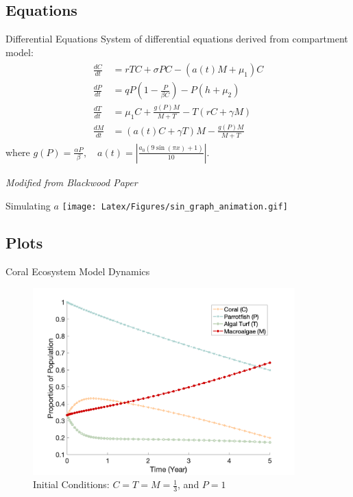 \documentclass{beamer}
\begin{document}
\subsection{Equations}
\begin{frame}{Differential Equations}
    System of differential equations derived from compartment model:
    \begin{align*}
        \begin{split}
            \frac{dC}{dt} &= rTC + \sigma PC- (a(t)M+\mu_{1})C\\
            \frac{dP}{dt} &= qP \left( 1-\frac{P}{\beta C} \right) - P \left( h+\mu_{2} \right)\\
            \frac{dT}{dt} &= \mu_{1}C + \frac{g(P)M}{M+T} - T(rC+\gamma M)\\
            \frac{dM}{dt} &= (a(t)C+ \gamma T)M - \frac{g(P)M}{M+T}
            \label{SoODE}
        \end{split}
    \end{align*}
    where $g(P) = \frac{\alpha P}{\beta}, \quad a(t)=|\frac{a_{0}(9\sin{(\pi x) }+1)}{10}|$.\\ 
    \quad
    \begin{center}
        \textit{Modified from Blackwood Paper\textsuperscript{\cite{13_blackwood_hastings_mumby_2010}}}
    \end{center}
\end{frame}

\begin{frame}{Simulating $a$}
    \texttt{[image: Latex/Figures/sin\_graph\_animation.gif]}
\end{frame}

\subsection{Plots}
\begin{frame}{Coral Ecosystem Model Dynamics}
    \begin{figure}
        \centering
        \includegraphics[width=0.9\textwidth]{Latex/Figures/initial_matlab_plot.png}
        \caption{Initial Conditions: $C = T = M = \frac{1}{3}$, and $P = 1$}
        \label{fig:initial_plot}
    \end{figure}
\end{frame}
\end{document}
